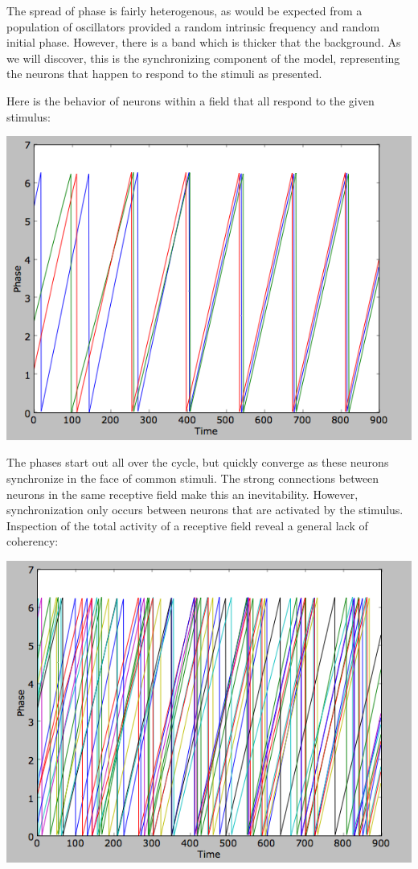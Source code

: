 \documentclass[12pt]{article}
\begin{document}
The spread of phase is fairly heterogenous, as would be expected from a population of oscillators provided a random intrinsic frequency and random initial phase.  However, there is a band which is thicker that the background.  As we will discover, this is the synchronizing component of the model, representing the neurons that happen to respond to the stimuli as presented.  

Here is the behavior of neurons within a field that all respond to the given stimulus:

\includegraphics[scale=0.5]{withinfield.png}

The phases start out all over the cycle, but quickly converge as these neurons synchronize in the face of common stimuli.  The strong connections between neurons in the same receptive field make this an inevitability.  However, synchronization only occurs between neurons that are activated by the stimulus.  Inspection of the total activity of a receptive field reveal a general lack of coherency:

\vspace{10pt}
\includegraphics[scale=0.5]{totalfield.png}
\end{document}
